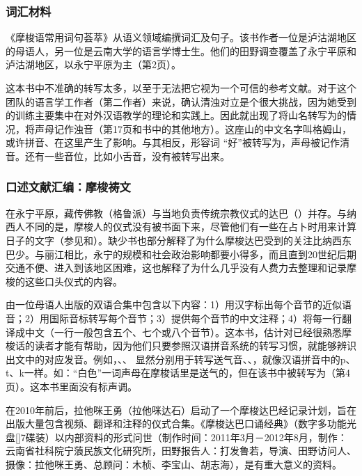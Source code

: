 \subsubsection{词汇材料}
\label{sec:dictionary2013}

《摩梭语常用词句荟萃》\parencite{zhibaetal2013}从语义领域编撰词汇及句子。该书作者一位是泸沽湖地区的母语人，另一位是云南大学的语言学博士生。他们的田野调查覆盖了永宁平原和泸沽湖地区，以永宁平原为主（第2页）。

这本书中不准确的转写太多，以至于无法把它视为一个可信的参考文献。对于这个团队的语言学工作者（第二作者）来说，确认清浊对立是个很大挑战，因为她受到的训练主要集中在对外汉语教学的理论和实践上。因此就出现了将山名转写为的情况，将声母记作浊音（第17页和书中的其他地方）。这座山的中文名字叫格姆山，或许拼音、在这里产生了影响。与其相反，形容词 “好”被转写为，声母被记作清音。还有一些音位，比如小舌音，没有被转写出来。


\subsubsection{口述文献汇编：摩梭祷文}
\label{sec:collectionsoforalliteraturenaritualtexts}
在永宁平原，藏传佛教（格鲁派）与当地负责传统宗教仪式的达巴（）并存。与纳西人不同的是，摩梭人的仪式没有被书面下来，尽管他们有一些在占卜时用来计算日子的文字（参见\textcite{yang1985}和\textcite[163-189]{lidazhu2015}）。缺少书也部分解释了为什么摩梭达巴受到的关注比纳西东巴少。与丽江相比，永宁的规模和社会政治影响都要小得多，而且直到20世纪后期交通不便、进入到该地区困难，这也解释了为什么几乎没有人费力去整理和记录摩梭的这些口头仪式的内容。

由一位母语人出版的双语合集中\parencite{azeming2013}包含以下内容：1）用汉字标出每个音节的近似语音；2）用国际音标转写每个音节；3）提供每个音节的中文注释；4）将每一行翻译成中文（一行一般包含五个、七个或八个音节）。这本书，估计对已经很熟悉摩梭话的读者才能有帮助，因为他们只要参照汉语拼音系统的转写习惯，就能够辨识出文中的对应发音。例如，、、
显然分别用于转写送气音、、，就像汉语拼音中的p、t、k一样。如：“白色”一词声母在摩梭话里是送气的，但在该书中被转写为（第4页）。这本书里面没有标声调。

在2010年前后，拉他咪王勇（拉他咪达石）启动了一个摩梭达巴经记录计划，旨在出版大量包含视频、翻译和注释的仪式合集。《摩梭达巴口诵经典》（数字多功能光盘[]7碟装）以内部资料的形式问世（制作时间：2011年3月－2012年8月，制作：云南省社科院宁蒗民族文化研究所，田野报告人：打发鲁若，导演、田野访问人、摄像：拉他咪王勇、总顾问：木桢、李宝山、胡志海），是有重大意义的资料。

